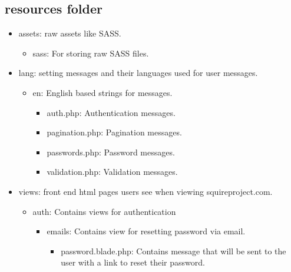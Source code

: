 \documentclass[11pt]{report}
\begin{document}

\subsection{resources folder}
\begin{itemize}
    \item assets: raw assets like SASS.
    \begin{itemize}
        \item sass: For storing raw SASS files.
    \end{itemize}
    \item lang: setting messages and their languages used for user messages.
    \begin{itemize}
        \item en: English based strings for messages.
        \begin{itemize}
            \item auth.php: Authentication messages.
            \item pagination.php: Pagination messages.
            \item passwords.php: Password messages.
            \item validation.php: Validation messages.
        \end{itemize}
    \end{itemize}
    \item views: front end html pages users see when viewing squireproject.com.
    \begin{itemize}
        \item auth: Contains views for authentication
        \begin{itemize}
            \item emails: Contains view for resetting password via email.
            \begin{itemize}
                \item password.blade.php: Contains message that will be sent to the user with a link to reset their password.

\end{itemize}
\end{itemize}
\end{itemize}
\end{itemize}
\end{document}
